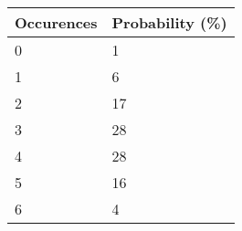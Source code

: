 \begin{tabular}{ll}
    Occurences & Probability (\%) \\
    \hline
    0          & 1                \\
    1          & 6                \\
    2          & 17               \\
    3          & 28               \\
    4          & 28               \\
    5          & 16               \\
    6          & 4                \\
    \hline
\end{tabular}